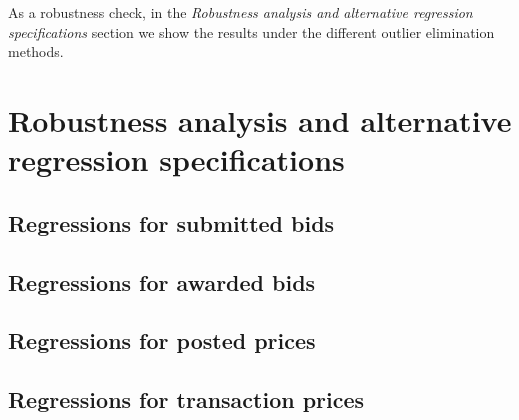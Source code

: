 As a robustness check, in the \textit{Robustness analysis and alternative regression specifications} section we show the results under the different outlier elimination methods.


\chapter{Robustness analysis and alternative regression 
 specifications}\label{app:robustness}


\section{Regressions for submitted bids}







\section{Regressions for awarded bids}




\section{Regressions for posted prices}



\section{Regressions for transaction prices}


